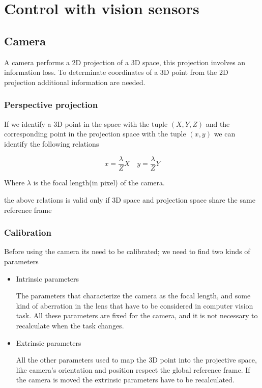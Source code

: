 \chapter{Control with vision sensors}\label{ch:vision-control}

\section{Camera}

A camera performs a 2D projection of a 3D space, this projection involves an information loss.
To determinate coordinates of a 3D point from the 2D projection additional information are needed.

\subsection{Perspective projection}

If we identify a 3D point in the space with the tuple \((X,Y,Z)\) and the corresponding point in the projection space with the tuple \((x,y)\) we can identify the following relations

\begin{equation}
	x = \frac{\lambda}{Z}X \quad y = \frac{\lambda}{Z}Y
\label{eq:projected_point}
\end{equation}

Where $\lambda$ is the focal length(in pixel) of the camera.

\begin{nb}the above relations is valid only if 3D space and projection space share the same reference frame\end{nb}

\subsection{Calibration}

Before using the camera its need to be calibrated; we need to find two kinds of parameters

\begin{itemize}
	\item Intrinsic parameters

	The parameters that characterize the camera as the focal length, and some kind of aberration in the lens that have to be considered in computer vision task.
	All these parameters are fixed for the camera, and it is not necessary to recalculate when the task changes.

	\item Extrinsic parameters

	All the other parameters used to map the 3D point into the projective space, like camera's orientation and position respect the global reference frame.
	If the camera is moved the extrinsic parameters have to be recalculated.
\end{itemize}

